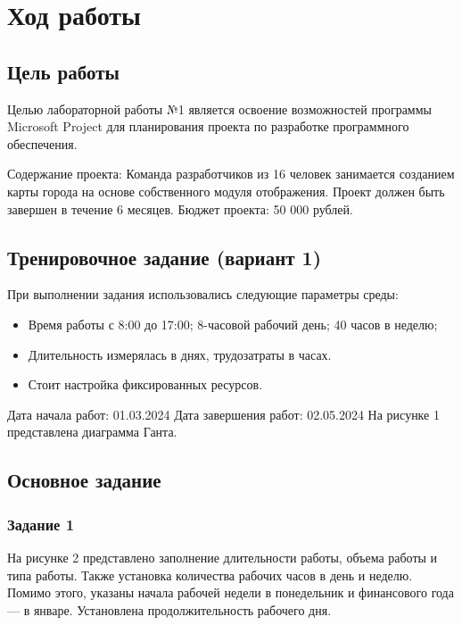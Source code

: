 
\chapter{Ход работы}

\section{Цель работы}
Целью лабораторной работы №1 является освоение возможностей программы Microsoft Project для планирования проекта по разработке программного обеспечения.

Содержание проекта: Команда разработчиков из 16 человек занимается созданием карты города на основе собственного модуля отображения. Проект должен быть завершен в течение 6 месяцев. Бюджет проекта: 50 000 рублей.

\section{Тренировочное задание (вариант 1)}
При выполнении задания использовались следующие параметры среды:
\begin{itemize}
\item	Время работы с 8:00 до 17:00; 8-часовой рабочий день; 40 часов в неделю;
\item	Длительность измерялась в днях, трудозатраты в часах.
\item	Стоит настройка фиксированных ресурсов.
\end{itemize}
Дата начала работ: 01.03.2024
Дата завершения работ: 02.05.2024
На рисунке 1 представлена диаграмма Ганта.


\section{Основное задание}
\subsection{Задание 1}
На рисунке 2 представлено заполнение длительности работы, объема работы и типа работы. Также установка количества рабочих часов в день и неделю. Помимо этого, указаны начала рабочей недели в понедельник и финансового года — в январе. Установлена продолжительность рабочего дня.

